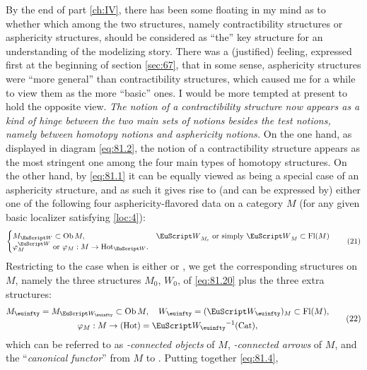 By the end of part \ref{ch:IV}, there has been some floating in my
mind as to whether which among the two structures, namely
contractibility structures or asphericity structures, should be
considered as ``the'' key structure for an understanding of the
modelizing story. There was a (justified) feeling, expressed first at
the beginning of section \ref{sec:67}, that in some sense, asphericity
structures were ``more general'' than contractibility structures,
which caused me for a while to view them as the more ``basic'' ones. I
would be more tempted at present to hold the opposite view. \emph{The
  notion of a contractibility structure now appears as a kind of hinge
  between the two main sets of notions besides the test notions,
  namely between homotopy notions and asphericity notions.} On the one
hand, as displayed in diagram \eqref{eq:81.2}, the notion of a
contractibility structure appears as the most stringent one among the
four main types of homotopy structures. On the other hand, by
\eqref{eq:81.1} it can be equally viewed as being a special case of an
asphericity structure, and as such it gives rise to (and can be
expressed by) either one of the following four asphericity-flavored
data on a category $M$ (for any given basic localizer \scrW{}
satisfying \ref{loc:4}):
\begin{equation}
  \label{eq:81.21}
  \begin{cases}
    M_\scrW\subset\Ob M,  &\text{$\scrW_{M\subc}$ or simply
      $\scrW_M\subset\Fl(M)$} \\
    \text{$\varphi_M^\scrW$ or $\varphi_M:M\to\HotOf_\scrW$.} &
  \end{cases}\tag{21}
\end{equation}
Restricting to the case when \scrW{} is either \scrWz{} or \scrWoo, we
get the corresponding structures on $M$, namely the three structures
$M_0$, $W_0$, \piz{} of \eqref{eq:81.20} plus the three extra
structures:
\begin{equation}
  \label{eq:81.22}
  \begin{gathered}
  M_\oo = M_\scrWoo \subset\Ob M, \quad
  W_\oo = (\scrWoo)_M\subset\Fl(M), \\
  \varphi_M : M\to\Hot = \scrWoo^{-1}\Cat,
  \end{gathered}\tag{22}
\end{equation}
which can be referred to as \emph{\oo-connected objects} of $M$,
\emph{\oo-connected arrows} of $M$, and the ``\emph{canonical
  functor}'' from $M$ to \Hot. Putting together \eqref{eq:81.4},
